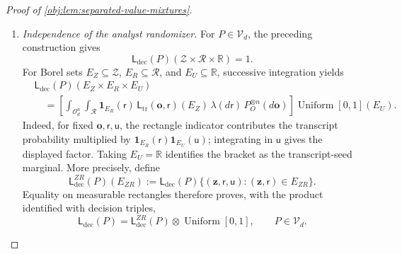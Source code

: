 \documentclass[11pt]{article}
\begin{document}
\begin{proof}[Proof of \cref{obj:lem:separated-value-mixtures}]
\begin{enumerate}
For a probability law \(P\), the finite atomic decomposition is
\[
P_O^{\otimes n}
=
\sum_{\mathbf o\in\mathcal O_d^n}
\left(\prod_{i=1}^nP_O(\{o_i\})\right)\delta_{\mathbf o}.
\]
Consequently, integrating the protocol against the canonical product sampling law gives exactly \(\mathsf L_{\mathrm{dec}}(P)\). Moreover, \cref{obj:ass:iid-people,obj:ass:independent-randomness} give, for every \(P\in\mathcal V_d\),
\[
\mathcal L_P(\mathbf O,R,U)
=
P_O^{\otimes n}\otimes\lambda
\otimes\operatorname{Uniform}[0,1],
\qquad
\mathsf L_{\mathrm{dec}}(P)
=
\mathcal L_{P,Q}(\mathbf Z,R,U).
\]
Define the completed mixtures, for \(\ell\in\{0,1\}\), by
\[
\mathsf L_\ell(E)
:=
\int \mathsf L_{\mathrm{dec}}(P)(E)\,\pi_\ell(dP).
\]
Causal support and the preceding equality imply
\[
\mathsf L_\ell(E)
=
\int_{\mathcal V_d}
\Pr_{P,Q}\{(\mathbf Z,R,U)\in E\}\,\pi_\ell(dP).
\]
Thus these are the decision mixtures in the statement, and their seed-transcript marginals are \(N_\ell\).

\item \textit{Independence of the analyst randomizer.}
For \(P\in\mathcal V_d\), the preceding construction gives
\[
\mathsf L_{\mathrm{dec}}(P)
(\mathcal Z\times\mathcal R\times\mathbb R)=1.
\]
For Borel sets \(E_Z\subseteq\mathcal Z\), \(E_R\subseteq\mathcal R\), and \(E_U\subseteq\mathbb R\), successive integration yields
\[
\begin{aligned}
&\mathsf L_{\mathrm{dec}}(P)(E_Z\times E_R\times E_U)\\
&\quad=
\left[
\int_{\mathcal O_d^n}\int_{\mathcal R}
\mathbf1_{E_R}(\mathsf r)\,
\mathsf L_{\mathrm{tr}}(\mathbf o,\mathsf r)(E_Z)\,
\lambda(d\mathsf r)\,P_O^{\otimes n}(d\mathbf o)
\right]
\operatorname{Uniform}[0,1](E_U).
\end{aligned}
\]
Indeed, for fixed \(\mathbf o,\mathsf r,\mathsf u\), the rectangle indicator contributes the transcript probability multiplied by
\(\mathbf1_{E_R}(\mathsf r)\mathbf1_{E_U}(\mathsf u)\); integrating in \(\mathsf u\) gives the displayed factor. Taking \(E_U=\mathbb R\) identifies the bracket as the transcript-seed marginal. More precisely, define
\[
\mathsf L_{\mathrm{dec}}^{ZR}(P)(E_{ZR})
:=
\mathsf L_{\mathrm{dec}}(P)
\{(\mathbf z,\mathsf r,\mathsf u):
(\mathbf z,\mathsf r)\in E_{ZR}\}.
\]
Equality on measurable rectangles therefore proves, with the product identified with decision triples,
\[
\mathsf L_{\mathrm{dec}}(P)
=
\mathsf L_{\mathrm{dec}}^{ZR}(P)
\otimes\operatorname{Uniform}[0,1],
\qquad P\in\mathcal V_d.
\]


\end{enumerate}
\end{proof}
\end{document}
